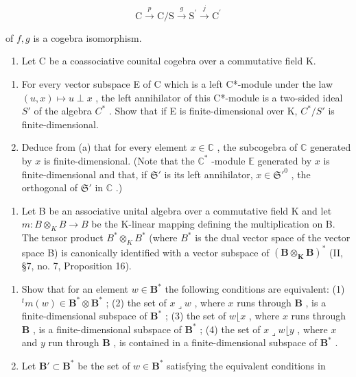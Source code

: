 \[
\mathrm{C} \xrightarrow {p} \mathrm{C} / \mathrm{S} \xrightarrow {g} \mathrm{S} ^ {\prime} \xrightarrow {j} \mathrm{C} ^ {\prime}
\]

of \(f, g\) is a cogebra isomorphism.

\begin{enumerate}
\def\labelenumi{(\arabic{enumi})}
\setcounter{enumi}{25}
\tightlist
\item
  Let C be a coassociative counital cogebra over a commutative field K.
\end{enumerate}

\begin{enumerate}
\def\labelenumi{(\alph{enumi})}
\item
  For every vector subspace E of C which is a left C*-module under the law \((u, x) \mapsto u \perp x\) , the left annihilator of this C*-module is a two-sided ideal \(S'\) of the algebra \(C^*\) . Show that if E is finite-dimensional over K, \(C^*/S'\) is finite-dimensional.
\item
  Deduce from (a) that for every element \(x \in \mathbb{C}\) , the subcogebra of \(\mathbb{C}\) generated by \(x\) is finite-dimensional. (Note that the \(\mathbb{C}^*\) -module \(\mathbb{E}\) generated by \(x\) is finite-dimensional and that, if \(\mathfrak{S}'\) is its left annihilator, \(x \in \mathfrak{S}'^0\) , the orthogonal of \(\mathfrak{S}'\) in \(\mathbb{C}\) .)
\end{enumerate}

\begin{enumerate}
\def\labelenumi{(\arabic{enumi})}
\setcounter{enumi}{26}
\tightlist
\item
  Let B be an associative unital algebra over a commutative field K and let \(m: B \otimes_{K} B \to B\) be the K-linear mapping defining the multiplication on B. The tensor product \(B^{*} \otimes_{K} B^{*}\) (where \(B^{*}\) is the dual vector space of the vector space B) is canonically identified with a vector subspace of \((\mathbf{B} \otimes_{\mathbf{K}} \mathbf{B})^{*}\) (II, §7, no. 7, Proposition 16).
\end{enumerate}

\begin{enumerate}
\def\labelenumi{(\alph{enumi})}
\item
  Show that for an element \(w \in \mathbf{B}^*\) the following conditions are equivalent: (1) \({}^t m(w) \in \mathbf{B}^* \otimes \mathbf{B}^*\) ; (2) the set of \(x \lrcorner w\) , where \(x\) runs through \(\mathbf{B}\) , is a finite-dimensional subspace of \(\mathbf{B}^*\) ; (3) the set of \(w \lfloor x\) , where \(x\) runs through \(\mathbf{B}\) , is a finite-dimensional subspace of \(\mathbf{B}^*\) ; (4) the set of \(x \lrcorner w \lfloor y\) , where \(x\) and \(y\) run through \(\mathbf{B}\) , is contained in a finite-dimensional subspace of \(\mathbf{B}^*\) .
\item
  Let \(\mathbf{B}' \subset \mathbf{B}^*\) be the set of \(w \in \mathbf{B}^*\) satisfying the equivalent conditions in
\end{enumerate}

